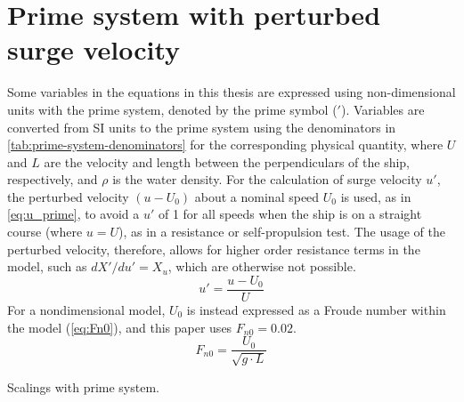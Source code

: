 \section{Prime system with perturbed surge velocity} \label{sec:prime_system}
Some variables in the equations in this thesis are expressed using non-dimensional units with the prime system, denoted by the prime symbol ($'$). Variables are converted from SI units to the prime system using the denominators in \autoref{tab:prime-system-denominators} for the corresponding physical quantity, where $U$ and $L$ are the velocity and length between the perpendiculars of the ship, respectively, and $\rho$ is the water density.
For the calculation of surge velocity $u'$, the perturbed velocity $(u-U_0)$ about a nominal speed $U_0$ is used, as in \autoref{eq:u_prime}, to avoid a $u'$ of 1 for all speeds when the ship is on a straight course (where $u=U$), as in a resistance or self-propulsion test. The usage of the perturbed velocity, therefore, allows for higher order resistance terms in the model, such as ${{dX}'/du}' = X_{u}$, which are otherwise not possible. 
\begin{equation}
    \label{eq:u_prime}
    u' = \frac{u-U_0}{U}
\end{equation}
For a nondimensional model, $U_0$ is instead expressed as a Froude number within the model (\autoref{eq:Fn0}), and this paper uses $F_{n0}=0.02$.
\begin{equation}
    \label{eq:Fn0}
    F_{n0} = \frac{U_0}{\sqrt{g \cdot L}}
\end{equation}
\begin{table}[h]
    \centering
    \caption{Scalings with prime system.}
    \label{tab:prime-system-denominators}
\end{table}